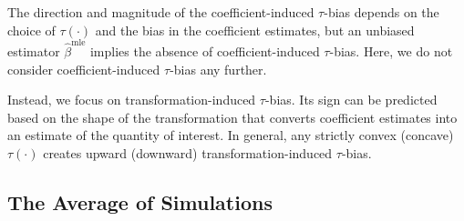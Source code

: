 \documentclass[11pt]{article}
\begin{document}
The direction and magnitude of the coefficient-induced $\tau$-bias depends on the choice of $\tau(\cdot)$ and the bias in the coefficient estimates, but an unbiased estimator $\hat{\beta}^\text{mle}$ implies the absence of coefficient-induced $\tau$-bias. Here, we do not consider coefficient-induced $\tau$-bias any further.

Instead, we focus on transformation-induced $\tau$-bias. Its sign can be predicted based on the shape of the transformation that converts coefficient estimates into an estimate of the quantity of interest. In general, any strictly convex (concave) $\tau(\cdot)$ creates upward (downward) transformation-induced $\tau$-bias.


\subsection*{The Average of Simulations}
\end{document}
